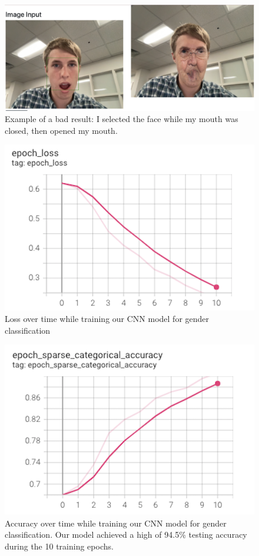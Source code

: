 \begin{figure}[t]
    \centering
    \includegraphics[width=\linewidth]{Screenshot_2022-05-09 16.29.35.png}
    \caption{Example of a bad result: I selected the face while my mouth was closed, then opened my mouth.}
    \label{fig:result6}
\end{figure}

\begin{figure}[t]
    \centering
    \includegraphics[width=\linewidth]{epoch_loss.png}
    \caption{Loss over time while training our CNN model for gender classification}
    \label{fig:result1}
\end{figure}

\begin{figure}[t]
    \centering
    \includegraphics[width=\linewidth]{epoch_accuracy.png}
    \caption{Accuracy over time while training our CNN model for gender classification. Our model achieved a high of 94.5\% testing accuracy during the 10 training epochs.}
    \label{fig:result1}
\end{figure}

